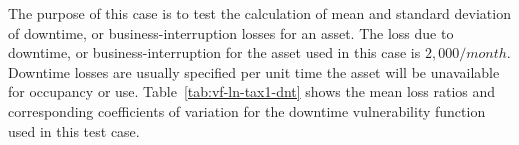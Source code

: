 The purpose of this case is to test the calculation of mean and standard deviation of downtime, or business-interruption losses for an asset. The loss due to downtime, or business-interruption for the asset used in this case is $2,000 / month$. Downtime losses are usually specified per unit time the asset will be unavailable for occupancy or use. Table~\ref{tab:vf-ln-tax1-dnt} shows the mean loss ratios and corresponding coefficients of variation for the downtime vulnerability function used in this test case.